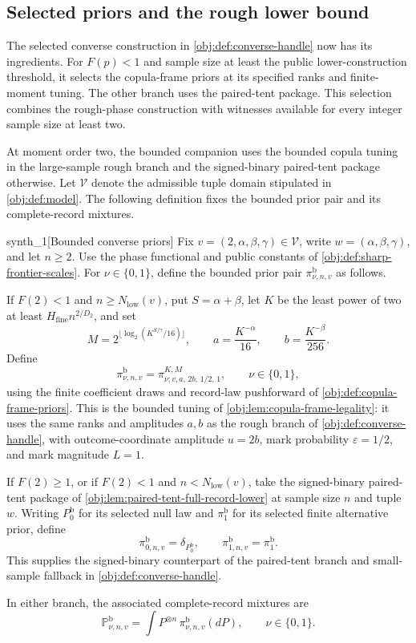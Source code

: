 \documentclass[11pt]{article}
\begin{document}
\subsection{Selected priors and the rough lower bound}

The selected converse construction in \cref{obj:def:converse-handle} now has its ingredients. For \(F(p)<1\) and sample size at least the public lower-construction threshold, it selects the copula-frame priors at its specified ranks and finite-moment tuning. The other branch uses the paired-tent package. This selection combines the rough-phase construction with witnesses available for every integer sample size at least two.

At moment order two, the bounded companion uses the bounded copula tuning in the large-sample rough branch and the signed-binary paired-tent package otherwise. Let \(\mathcal V\) denote the admissible tuple domain stipulated in \cref{obj:def:model}. The following definition fixes the bounded prior pair and its complete-record mixtures.

\begin{definitionv}{synth_1}[Bounded converse priors]
Fix \(v=(2,\alpha,\beta,\gamma)\in\mathcal V\), write \(w=(\alpha,\beta,\gamma)\), and let \(n\ge2\). Use the phase functional and public constants of \cref{obj:def:sharp-frontier-scales}. For \(\nu\in\{0,1\}\), define the bounded prior pair \(\pi^{\mathrm b}_{\nu,n,v}\) as follows.

If \(F(2)<1\) and \(n\ge N_{\mathrm{low}}(v)\), put \(S=\alpha+\beta\), let \(K\) be the least power of two at least \(H_{\mathrm{fine}}n^{2/D_2}\), and set
\[
 M=2^{\lfloor\log_2(K^{S/\gamma}/16)\rfloor},
 \qquad a=\frac{K^{-\alpha}}{16},
 \qquad b=\frac{K^{-\beta}}{256}.
\]
Define
\[
 \pi^{\mathrm b}_{\nu,n,v}
   =\pi^{K,M}_{\nu;v,a,\,2b,\,1/2,\,1},
 \qquad \nu\in\{0,1\},
\]
using the finite coefficient draws and record-law pushforward of \cref{obj:def:copula-frame-priors}. This is the bounded tuning of \cref{obj:lem:copula-frame-legality}: it uses the same ranks and amplitudes \(a,b\) as the rough branch of \cref{obj:def:converse-handle}, with outcome-coordinate amplitude \(u=2b\), mark probability \(\varepsilon=1/2\), and mark magnitude \(L=1\).

If \(F(2)\ge1\), or if \(F(2)<1\) and \(n<N_{\mathrm{low}}(v)\), take the signed-binary paired-tent package of \cref{obj:lem:paired-tent-full-record-lower} at sample size \(n\) and tuple \(w\). Writing \(P_0^{\mathrm b}\) for its selected null law and \(\pi_1^{\mathrm b}\) for its selected finite alternative prior, define
\[
 \pi^{\mathrm b}_{0,n,v}=\delta_{P_0^{\mathrm b}},
 \qquad
 \pi^{\mathrm b}_{1,n,v}=\pi_1^{\mathrm b}.
\]
This supplies the signed-binary counterpart of the paired-tent branch and small-sample fallback in \cref{obj:def:converse-handle}.

In either branch, the associated complete-record mixtures are
\[
 \mathbb P^{\mathrm b}_{\nu,n,v}
   =\int P^{\otimes n}\,\pi^{\mathrm b}_{\nu,n,v}(dP),
 \qquad \nu\in\{0,1\}.
\]
\end{definitionv}
\end{document}
